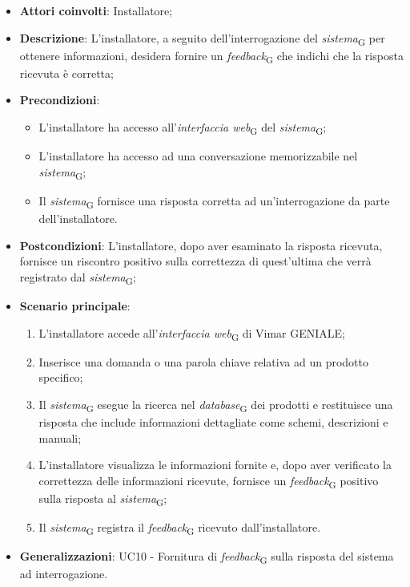 \begin{itemize}
    \item \textbf{Attori coinvolti}: Installatore;
    \item \textbf{Descrizione}: L’installatore, a seguito dell’interrogazione del \textit{sistema}\textsubscript{G} per ottenere informazioni, desidera fornire un \textit{feedback}\textsubscript{G} che indichi che la risposta ricevuta è corretta;
    \item \textbf{Precondizioni}: 
    \begin{itemize}
        \item L’installatore ha accesso all’\textit{interfaccia web}\textsubscript{G} del \textit{sistema}\textsubscript{G};
        \item L’installatore ha accesso ad una conversazione memorizzabile nel \textit{sistema}\textsubscript{G};
        \item Il \textit{sistema}\textsubscript{G} fornisce una risposta corretta ad un’interrogazione da parte dell’installatore.
    \end{itemize}
    \item \textbf{Postcondizioni}: L’installatore, dopo aver esaminato la risposta ricevuta, fornisce un riscontro positivo sulla correttezza di quest’ultima che verrà registrato dal \textit{sistema}\textsubscript{G};
    \item \textbf{Scenario principale}:
    \begin{enumerate}
        \item L’installatore accede all’\textit{interfaccia web}\textsubscript{G} di Vimar GENIALE;
        \item Inserisce una domanda o una parola chiave relativa ad un prodotto specifico;
        \item Il \textit{sistema}\textsubscript{G} esegue la ricerca nel \textit{database}\textsubscript{G} dei prodotti e restituisce una risposta che include informazioni dettagliate come schemi, descrizioni e manuali;
        \item L’installatore visualizza le informazioni fornite e, dopo aver verificato la correttezza delle informazioni ricevute, fornisce un \textit{feedback}\textsubscript{G} positivo sulla risposta al \textit{sistema}\textsubscript{G};
        \item Il \textit{sistema}\textsubscript{G} registra il \textit{feedback}\textsubscript{G} ricevuto dall’installatore.
    \end{enumerate}
    \item \textbf{Generalizzazioni}: UC10 - Fornitura di \textit{feedback}\textsubscript{G} sulla risposta del sistema ad interrogazione.
\end{itemize}

